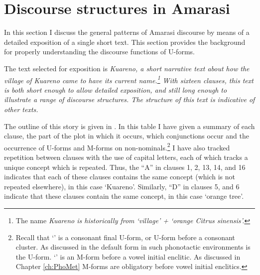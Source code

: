 \section{Discourse structures in Amarasi}\label{sec:DisStrAma}
In this section I discuss the general patterns of Amarasi discourse
by means of a detailed exposition of a single short text.
This section provides the background for properly
understanding the discourse functions of U-forms.

The text selected for exposition is \it{Kuareno{\Q}},
a short narrative text about how the village of \it{Kuareno{\Q}}
came to have its current name.\footnote{
	The name \it{Kuareno{\Q}} is historically from
	 `village' +  `orange \it{Citrus sinensis}'.}
With sixteen clauses, this text is both short enough to allow detailed exposition,
and still long enough to illustrate a range of discourse structures.
The structure of this text is indicative of other texts.

The outline of this story is given in .
In this table I have given a summary of each clause,
the part of the plot in which it occurs, which conjunctions occur
and the occurrence of U-forms and M-forms on non-nominals.\footnote{
		Recall that `{\Ucc}' is a consonant final U-form,
		or U-form before a consonant cluster.
		As discussed in 
		the default form in such phonotactic environments is the U-form.
		`{\Mvv}' is an M-form before a vowel initial enclitic.
		As discussed in Chapter \ref{ch:PhoMet} M-forms
		are obligatory before vowel initial enclitics.}
I have also tracked repetition between clauses with the use of capital letters,
each of which tracks a unique concept which is repeated.
Thus, the ``A'' in clauses 1, 2, 13, 14, and 16 indicates
that each of these clauses contains the same concept
(which is not repeated elsewhere), in this case  `Kuareno{\Q}'.
Similarly, ``D'' in clauses 5, and 6 indicate that these clauses
contain the same concept, in this case  `orange tree'.

